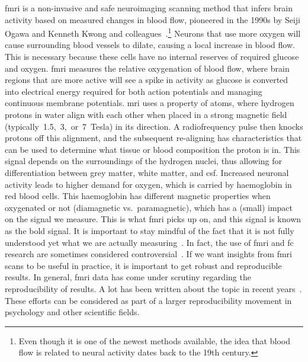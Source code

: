 \gls{fmri} is a non-invasive and safe neuroimaging scanning method that infers brain activity based on measured changes in blood flow, pioneered in the 1990s by Seiji Ogawa and Kenneth Kwong and colleagues~\parencite[see][for a historical perspective]{Raichle1998}.\footnote{Even though it is one of the newest methods available, the idea that blood flow is related to neural activity dates back to the 19th century.}
%
Neurons that use more oxygen will cause surrounding blood vessels to dilate, causing a local increase in blood flow.
This is necessary because these cells have no internal reserves of required glucose and oxygen.
\gls{fmri} measures the relative oxygenation of blood flow, where brain regions that are more active will see a spike in activity as glucose is converted into electrical energy required for both action potentials and managing continuous membrane potentials.
\gls{mri} uses a property of atoms, where hydrogen protons in water align with each other when placed in a strong magnetic field (typically~1.5,~3,~or~7~Tesla) in its direction.
A radiofrequency pulse then knocks protons off this alignment, and the subsequent re-aligning has characteristics that can be used to determine what tissue or blood composition the proton is in.
This signal depends on the surroundings of the hydrogen nuclei, thus allowing for differentiation between grey matter, white matter, and \gls{csf}.
%
Increased neuronal activity leads to higher demand for oxygen, which is carried by haemoglobin in red blood cells.
This haemoglobin has different magnetic properties when oxygenated or not (diamagnetic vs.~paramagnetic), which has a (small) impact on the signal we measure.
This is what \gls{fmri} picks up on, and this signal is known as the \gls{bold} signal.
%
It is important to stay mindful of the fact that it is not fully understood yet what we are actually measuring~\parencite{Logothetis2004, Cole2010}.
In fact, the use of \gls{fmri} and \gls{fc} research are sometimes considered controversial~\parencite{Mehler2018}.
If we want insights from \gls{fmri} scans to be useful in practice, it is important to get robust and reproducible results.
In general, \gls{fmri} data has come under scrutiny regarding the reproducibility of results.
A lot has been written about the topic in recent years~\parencite[see e.g.][]{Kriegeskorte2009, Gilmore2017, Poldrack2017, Botvinik-Nezer2020, Lindquist2020, Elliott2021, Aquino2022}.
These efforts can be considered as part of a larger reproducibility movement in psychology and other scientific fields.

